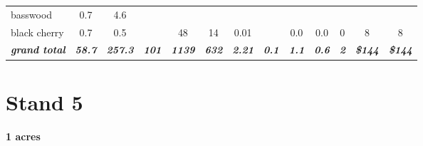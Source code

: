 \documentclass[landscape]{article}
\begin{document}
\begin{table}[H]
\begin{tabular}[t]{lcccccccccccc}
\rowcolor{gray!6}  basswood & 0.7 & 4.6 &  &  &  &  &  &  &  &  &  & \\
 
black cherry & 0.7 & 0.5 &  & 48 & 14 & 0.01 &  & 0.0 & 0.0 & 0 & 8 & 8\\
 
\rowcolor{gray!6}  \rowcolor[HTML]{DCDCDC}  \em{\textbf{grand total}} & \em{\textbf{58.7}} & \em{\textbf{257.3}} & \em{\textbf{101}} & \em{\textbf{1139}} & \em{\textbf{632}} & \em{\textbf{2.21}} & \em{\textbf{0.1}} & \em{\textbf{1.1}} & \em{\textbf{0.6}} & \em{\textbf{2}} & \em{\textbf{\$144}} & \em{\textbf{\$144}}\\
\bottomrule
\end{tabular}
\end{table}

\pagebreak

\section{Stand 5}\label{stand-5}

\textbf{1 acres}
\end{document}
